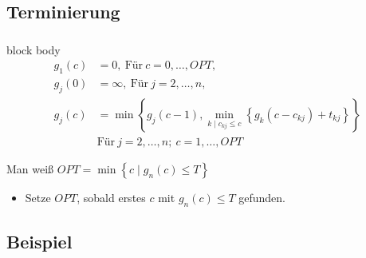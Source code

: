\documentclass{beamer}
\begin{document}
\subsection{Terminierung}

\begin{frame}
   \frametitle{\insertsection}
   \framesubtitle{\insertsubsection}

   \begin{beamercolorbox}[center,wd=\paperwidth]{block body}
      \begin{align*}
         g_1(c) & =  0, ~ \text{Für} ~ c = 0,\ldots,OPT, \\
         g_j(0) & =  \infty, ~ \text{Für} ~ j = 2,\ldots,n, \\
         g_j(c) & =  \min\left\{g_j(c-1), \min_{k \mid c_{kj} \le c}\left\{g_k(c-c_{kj}) + t_{kj}\right\}\right\} \\
                & \text{Für} ~ j = 2,\ldots,n; ~ c= 1,\ldots,OPT
      \end{align*}
   \end{beamercolorbox}

   Man weiß $OPT=\min\left\{c \mid g_n(c) \le T\right\}$
   \begin{itemize}
      \item Setze $OPT$, sobald erstes $c$ mit $g_n(c)\le T$ gefunden.
   \end{itemize}
\end{frame}


\subsection{Beispiel}
\end{document}
